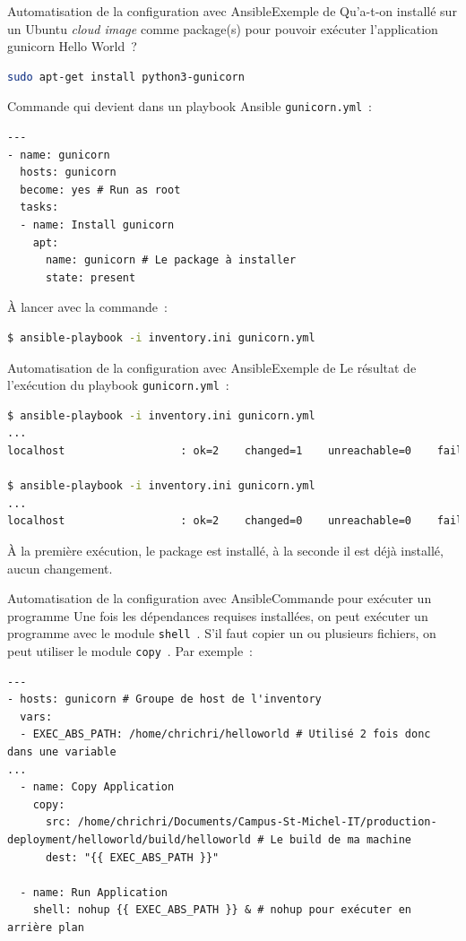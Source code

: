 \documentclass{beamer}
\begin{document}
    \begin{frame}[fragile]{Automatisation de la configuration avec Ansible}{Exemple de }
        Qu'a-t-on installé sur un Ubuntu \textit{cloud image} comme package(s) pour pouvoir exécuter l'application gunicorn Hello World~?
        \pause
        \begin{lstlisting}[language=bash]
sudo apt-get install python3-gunicorn
        \end{lstlisting}
        Commande qui devient dans un playbook Ansible \lstinline{gunicorn.yml}~:
        \begin{lstlisting}
---
- name: gunicorn
  hosts: gunicorn
  become: yes # Run as root
  tasks:
  - name: Install gunicorn
    apt:
      name: gunicorn # Le package à installer
      state: present
        \end{lstlisting}
        À lancer avec la commande~:
        \begin{lstlisting}[language=bash]
$ ansible-playbook -i inventory.ini gunicorn.yml
        \end{lstlisting}
    \end{frame}

    \begin{frame}[fragile]{Automatisation de la configuration avec Ansible}{Exemple de }
        Le résultat de l'exécution du playbook \lstinline{gunicorn.yml}~:
        \begin{lstlisting}[language=bash]
$ ansible-playbook -i inventory.ini gunicorn.yml
...
localhost                  : ok=2    changed=1    unreachable=0    failed=0    skipped=0    rescued=0    ignored=0

$ ansible-playbook -i inventory.ini gunicorn.yml
...
localhost                  : ok=2    changed=0    unreachable=0    failed=0    skipped=0    rescued=0    ignored=0
        \end{lstlisting}
        À la première exécution, le package est installé, à la seconde il est déjà installé, aucun changement.
    \end{frame}

    \begin{frame}[fragile]{Automatisation de la configuration avec Ansible}{Commande pour exécuter un programme}
        Une fois les dépendances requises installées, on peut exécuter un programme avec le module \lstinline{shell}~.
        \bigbreak
        S’il faut copier un ou plusieurs fichiers, on peut utiliser le module \lstinline{copy}~.
        \bigbreak
        Par exemple~:
        \begin{lstlisting}
---
- hosts: gunicorn # Groupe de host de l'inventory
  vars:
  - EXEC_ABS_PATH: /home/chrichri/helloworld # Utilisé 2 fois donc dans une variable
...
  - name: Copy Application
    copy:
      src: /home/chrichri/Documents/Campus-St-Michel-IT/production-deployment/helloworld/build/helloworld # Le build de ma machine
      dest: "{{ EXEC_ABS_PATH }}"

  - name: Run Application
    shell: nohup {{ EXEC_ABS_PATH }} & # nohup pour exécuter en arrière plan
        \end{lstlisting}
    \end{frame}
\end{document}
